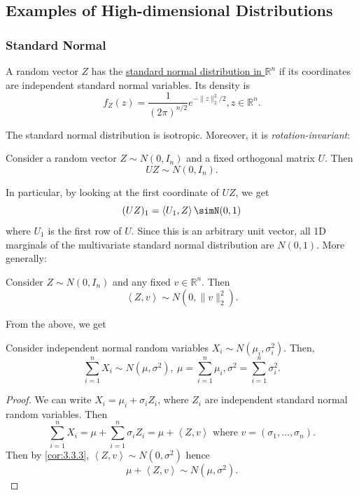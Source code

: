 \subsection{Examples of High-dimensional Distributions}


\subsubsection{Standard Normal}
A random vector $Z$ has the \underline{standard normal distribution in $\mathbb{R}^n$} if its coordinates 
are independent standard normal variables. Its density is 
\[ f_Z(z) = \frac{1}{(2 \pi)^{n/2}} e^{-\lVert z \rVert_{2}^2 / 2}, z \in \mathbb{R}^n. \]

The standard normal distribution is isotropic. Moreover, it is \textit{rotation-invariant}:

\begin{proposition}
\label{prop:3.3.1}
Consider a random vector $Z \sim N(0, I_n)$ and a fixed orthogonal matrix $U$. Then 
\[ UZ \sim N(0, I_n). \]
\end{proposition}

In particular, by looking at the first coordinate of $UZ$, we get 
\[ (UZ)_1 = \left\langle U_1, Z \right\rangle \simN(0, 1) \]
where $U_1$ is the first row of $U$. Since this is an arbitrary unit vector, all 1D marginals of the 
multivariate standard normal distribution are $N(0, 1)$. More generally: 

\begin{corollary}
\label{cor:3.3.2}
Consider $Z \sim N(0, I_n)$ and any fixed $v \in \mathbb{R}^n$. Then 
\[ \left\langle Z, v \right\rangle \sim N(0, \lVert v \rVert_{2}^2). \]
\end{corollary}

From the above, we get 
\begin{corollary}
\label{cor:3.3.3}
Consider independent normal random variables $X_i \sim N(\mu_i, \sigma_i^2)$. Then, 
\[ \sum_{i = 1}^{n} X_i \sim N(\mu, \sigma^2), \ \mu = \sum_{i = 1}^{n}\mu_i, 
\sigma^2 = \sum_{i = 1}^{n} \sigma_i^2. \]
\end{corollary}

\begin{proof}
We can write $X_i = \mu_i + \sigma_i Z_i$, where $Z_i$ are independent standard normal random variables. 
Then 
\[ \sum_{i = 1}^{n} X_i = \mu + \sum_{i = 1}^{n} \sigma_i Z_i = \mu + 
\left\langle Z, v \right\rangle \text{ where } v = (\sigma_1, \dots, \sigma_n). \]
Then by \cref{cor:3.3.3}, $\left\langle Z, v \right\rangle \sim N(0, \sigma^2)$ hence 
\[ \mu + \left\langle Z, v \right\rangle \sim N(\mu, \sigma^2). \]
\end{proof}


